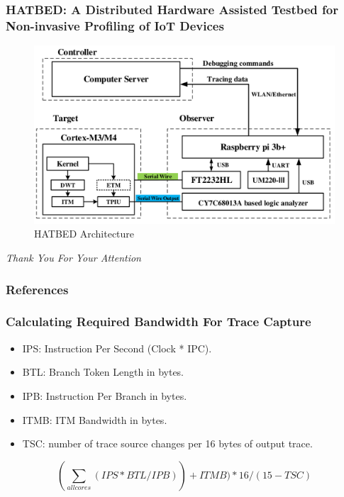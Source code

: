 \documentclass{beamer}
\begin{document}
\begin{frame}
    \frametitle{HATBED: A Distributed Hardware Assisted Testbed
    for Non-invasive Profiling of IoT Devices}
    \begin{figure}
        \centering
        \includegraphics[width=0.80\columnwidth]{hatbed.png}
        \caption{HATBED Architecture}
        \label{fig:bedofnails}
    \end{figure}
\end{frame}

\begin{frame}
  \centering \Large
  \emph{Thank You For Your Attention}
\end{frame}

\begin{frame}[allowframebreaks]
    \frametitle{References}
    \printbibliography
\end{frame}

\begin{frame}
    \frametitle{Calculating Required Bandwidth For Trace Capture}
    \begin{itemize}
        \item IPS: Instruction Per Second (Clock * IPC).
        \item BTL: Branch Token Length in bytes.
        \item IPB: Instruction Per Branch in bytes.
        \item ITMB: ITM Bandwidth in bytes.
        \item TSC: number of trace source changes per 16 bytes of output trace. \cite{arm2020tpiu}
    \end{itemize}
    \begin{equation}
        (\sum_{all cores}(IPS * BTL
        / IPB)) + ITMB) * 16 / (15 - TSC)
    \end{equation}
\end{frame}
\end{document}
